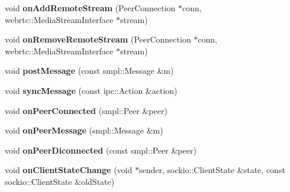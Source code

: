 \begin{DoxyCompactItemize}
void {\bfseries on\+Add\+Remote\+Stream} (Peer\+Connection $\ast$conn, webrtc\+::\+Media\+Stream\+Interface $\ast$stream)
\item 
\mbox{\label{classscy_1_1_signaler_a7e02cb1ea085168dcd38376d4666ce64}} 
void {\bfseries on\+Remove\+Remote\+Stream} (Peer\+Connection $\ast$conn, webrtc\+::\+Media\+Stream\+Interface $\ast$stream)
\item 
\mbox{\label{classscy_1_1_signaler_a91080ecc1ee1ed673568d25cf54f04e3}} 
void {\bfseries post\+Message} (const smpl\+::\+Message \&m)
\item 
\mbox{\label{classscy_1_1_signaler_a5a9e9eed49e46efd024ac982fdb5385d}} 
void {\bfseries sync\+Message} (const ipc\+::\+Action \&action)
\item 
\mbox{\label{classscy_1_1_signaler_a6f74997146bf66ed82f460ff027731ff}} 
void {\bfseries on\+Peer\+Connected} (smpl\+::\+Peer \&peer)
\item 
\mbox{\label{classscy_1_1_signaler_af5e47226a7227c15f2e8927f9b91cef8}} 
void {\bfseries on\+Peer\+Message} (smpl\+::\+Message \&m)
\item 
\mbox{\label{classscy_1_1_signaler_a053e9a7140fcd0af2220c3d4d9eed533}} 
void {\bfseries on\+Peer\+Diconnected} (const smpl\+::\+Peer \&peer)
\item 
\mbox{\label{classscy_1_1_signaler_abcb13e297f846fd0b70120b194ef1ef6}} 
void {\bfseries on\+Client\+State\+Change} (void $\ast$sender, sockio\+::\+Client\+State \&state, const sockio\+::\+Client\+State \&old\+State)
\end{DoxyCompactItemize}
